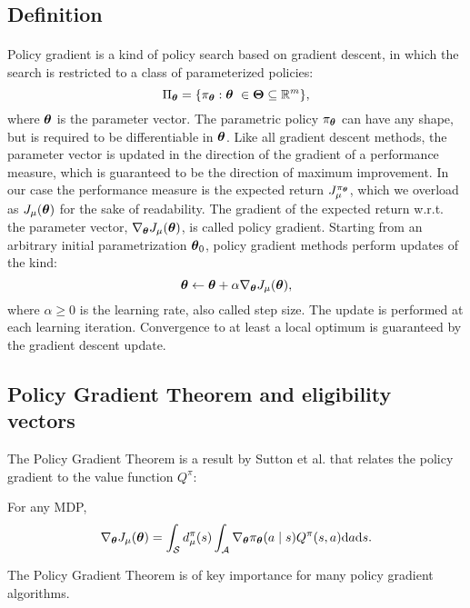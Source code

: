 \subsection{Definition}
\paragraph{} %
Policy gradient is a kind of policy search based on gradient descent, in which the search is restricted to a class of parameterized policies:  
\[
	\Pi_{\vtheta} = \{\pi_{\vtheta}:\vtheta\ \in \vTheta \subseteq \mathbb{R}^m\},
\]
where $\boldsymbol{\theta}$ is the parameter vector. The parametric policy $\pi_{\boldsymbol{\theta}}$ can have any shape, but is required to be differentiable in $\boldsymbol{\theta}$. Like all gradient descent methods, the parameter vector is updated in the direction of the gradient of a performance measure, which is guaranteed to be the direction of maximum improvement. In our case the performance measure is the expected return $J_{\mu}^{\pi_{\boldsymbol{\theta}}}$, which we overload as $J_{\mu}(\boldsymbol{\theta})$ for the sake of readability. The gradient of the expected return w.r.t. the parameter vector, $\nabla_{\boldsymbol{\theta}}J_\mu(\boldsymbol{\theta})$, is called policy gradient. Starting from an arbitrary initial parametrization $\boldsymbol{\theta}_0$, policy gradient methods perform updates of the kind: 
\[
	\boldsymbol{\theta} \gets \boldsymbol{\theta} + \alpha\nabla_{\boldsymbol{\theta}}J_\mu(\boldsymbol{\theta}),
\]
where $\alpha \geq 0$ is the learning rate, also called step size. The update is performed at each learning iteration.
Convergence to at least a local optimum is guaranteed by the gradient descent update.

\subsection{Policy Gradient Theorem and eligibility vectors}
The Policy Gradient Theorem is a result by Sutton et al. \cite{Sutton1999a} that relates the policy gradient to the value function $Q^\pi$:
\begin{theorem}\label{theo:pgt}
For any \ac{MDP},
\[
	\nabla_{\boldsymbol{\theta}}J_\mu(\boldsymbol{\theta}) = \int_{\mathcal{S}}d_{\mu}^{\pi}(s)
		\int_{\mathcal{A}} \nabla_{\boldsymbol{\theta}}\pi_{\boldsymbol{\theta}}(a \mid s)Q^{\pi}(s,a)\mathrm{d}a\mathrm{d}s.
\]
\end{theorem}
The Policy Gradient Theorem is of key importance for many policy gradient algorithms.

